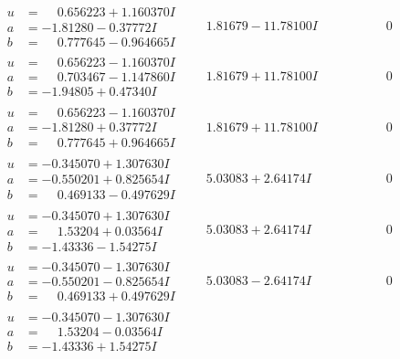 \documentclass[1p]{elsarticle_modified}
\theoremstyle{definition}
\begin{document}
$$\begin{array}{c|c|c}
\begin{aligned}
u &= \phantom{-}0.656223 + 1.160370 I \\
a &= -1.81280 - 0.37772 I \\
b &= \phantom{-}0.777645 - 0.964665 I\end{aligned}
 & \phantom{-}1.81679 - 11.78100 I & \phantom{-0.000000 } 0 \\ \hline\begin{aligned}
u &= \phantom{-}0.656223 - 1.160370 I \\
a &= \phantom{-}0.703467 - 1.147860 I \\
b &= -1.94805 + 0.47340 I\end{aligned}
 & \phantom{-}1.81679 + 11.78100 I & \phantom{-0.000000 } 0 \\ \hline\begin{aligned}
u &= \phantom{-}0.656223 - 1.160370 I \\
a &= -1.81280 + 0.37772 I \\
b &= \phantom{-}0.777645 + 0.964665 I\end{aligned}
 & \phantom{-}1.81679 + 11.78100 I & \phantom{-0.000000 } 0 \\ \hline\begin{aligned}
u &= -0.345070 + 1.307630 I \\
a &= -0.550201 + 0.825654 I \\
b &= \phantom{-}0.469133 - 0.497629 I\end{aligned}
 & \phantom{-}5.03083 + 2.64174 I & \phantom{-0.000000 } 0 \\ \hline\begin{aligned}
u &= -0.345070 + 1.307630 I \\
a &= \phantom{-}1.53204 + 0.03564 I \\
b &= -1.43336 - 1.54275 I\end{aligned}
 & \phantom{-}5.03083 + 2.64174 I & \phantom{-0.000000 } 0 \\ \hline\begin{aligned}
u &= -0.345070 - 1.307630 I \\
a &= -0.550201 - 0.825654 I \\
b &= \phantom{-}0.469133 + 0.497629 I\end{aligned}
 & \phantom{-}5.03083 - 2.64174 I & \phantom{-0.000000 } 0 \\ \hline\begin{aligned}
u &= -0.345070 - 1.307630 I \\
a &= \phantom{-}1.53204 - 0.03564 I \\
b &= -1.43336 + 1.54275 I\end{aligned}

\end{array}$$
\end{document}
